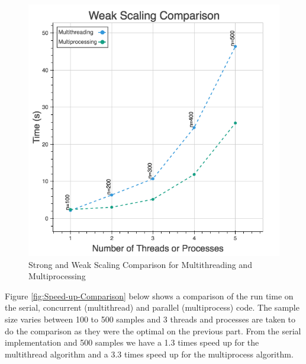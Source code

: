 \documentclass[10pt,twocolumn,letterpaper]{article}
\begin{document}
\begin{figure}[htbp]
\begin{center}
\includegraphics[scale=0.35]{figure/mt_mp_ws_comp.png}
\end{center}

\caption{\label{fig:Strong-and-Weak}Strong and Weak Scaling Comparison for
Multithreading and Multiprocessing}


\end{figure}


Figure \ref{fig:Speed-up-Comparison} below shows a comparison of
the run time on the serial, concurrent (multithread) and parallel
(multiprocess) code. The sample size varies between 100 to 500 samples
and 3 threads and processes are taken to do the comparison as they
were the optimal on the previous part. From the serial implementation
and 500 samples we have a 1.3 times speed up for the multithread algorithm
and a 3.3 times speed up for the multiprocess algorithm.
\end{document}
